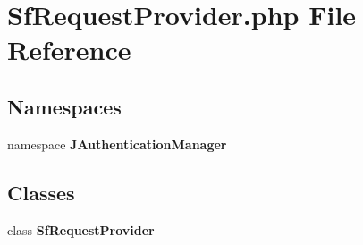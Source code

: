 \section{SfRequestProvider.php File Reference}
\label{SfRequestProvider_8php}
\subsection*{Namespaces}
\begin{CompactItemize}
\item 
namespace {\bf JAuthenticationManager}
\end{CompactItemize}
\subsection*{Classes}
\begin{CompactItemize}
\item 
class {\bf SfRequestProvider}
\end{CompactItemize}
